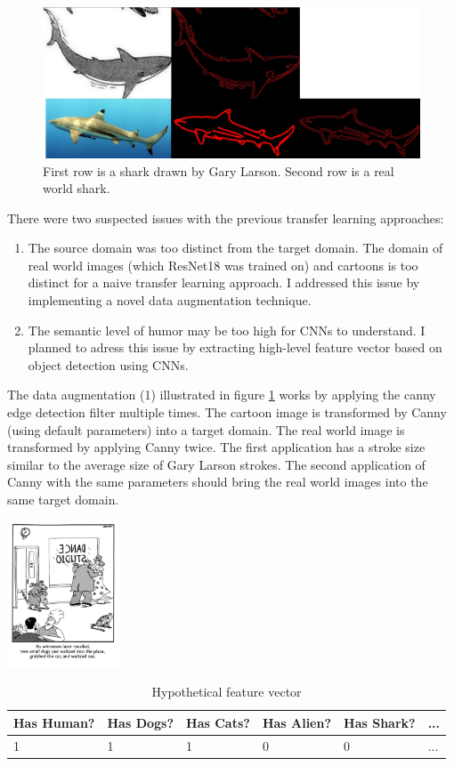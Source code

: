 \documentclass[draft,final,oneside]{vutinfth} %
\begin{document}
\begin{figure}[ht]
	\centering
  	\includegraphics[width=1.0\textwidth]{graphics/edge_edge_detection.jpg}
	\caption{First row is a shark drawn by Gary Larson. Second row is a real world shark.}
	\label{fig:dataugmentation}
\end{figure}

There were two suspected issues with the previous transfer learning approaches:

\begin{enumerate}
\item The source domain was too distinct from the target domain. The domain of real world images (which ResNet18 was trained on) and cartoons is too distinct for a naive transfer learning approach. I addressed this issue by implementing a novel data augmentation technique.
\item The semantic level of humor may be too high for CNNs to understand. I planned to adress this issue by extracting high-level feature vector based on object detection using CNNs.
\end{enumerate}

The data augmentation (1) illustrated in figure \ref{fig:dataugmentation} works by applying the canny edge detection filter multiple times. The cartoon image is transformed by Canny (using default parameters) into a target domain. The real world image is transformed by applying Canny twice. The first application has a stroke size similar to the average size of Gary Larson strokes. The second application of Canny with the same parameters should bring the real world images into the same target domain.

\begin{table}[]
\centering
\includegraphics[width=0.25\textwidth]{graphics/example_cartoon.png}
\begin{tabular}{|l|l|l|l|l|l|}
\hline
Has Human? & Has Dogs? & Has Cats? & Has Alien? & Has Shark? & ... \\ \hline
1   & 1 & 1 & 0 & 0 & ... \\
\hline
\end{tabular}
\caption{Hypothetical feature vector}
\label{objectdetectionfeaturevector}
\end{table}
\end{document}
